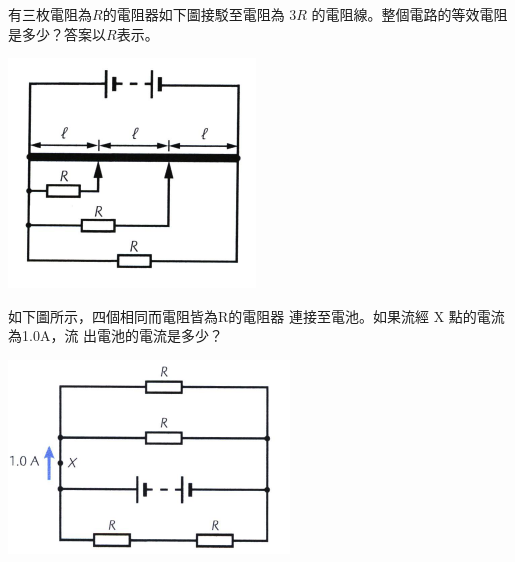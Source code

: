 {
    有三枚電阻為$R$的電阻器如下圖接駁至電阻為 $3R$ 的電阻線。整個電路的等效電阻是多少？答案以$R$表示。
    \par{\par\centering\includegraphics[width=.35\textwidth]{./img/ch2_circuit_lq_2024-06-14-14-12-24.png}\par}

}{}

{
    如下圖所示，四個相同而電阻皆為R的電阻器 連接至電池。如果流經 X 點的電流為1.0A，流 出電池的電流是多少？
    \par{\par\centering\includegraphics[width=.35\textwidth]{./img/ch2_circuit_lq_2024-06-14-14-13-12.png}\par}
}{}


